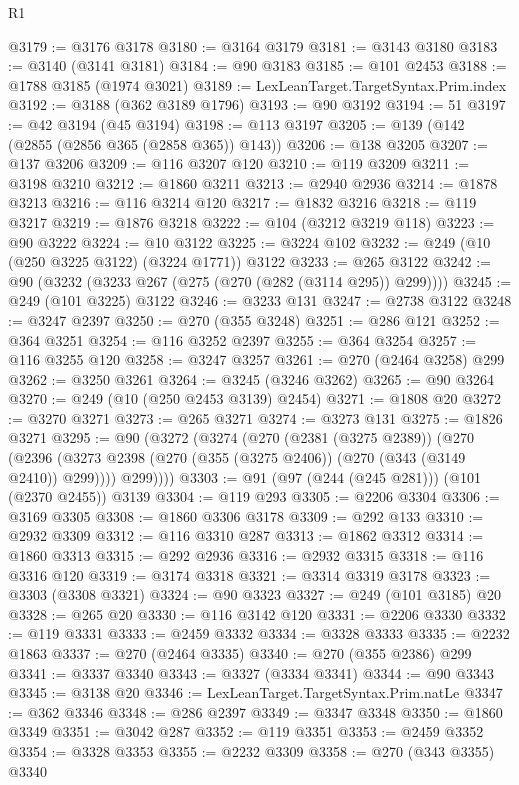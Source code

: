 \begin{lexlean}{R1}
\begin{coremodule}
@3179 := @3176 @3178
@3180 := @3164 @3179
@3181 := @3143 @3180
@3183 := @3140 (@3141 @3181)
@3184 := @90 @3183
@3185 := @101 @2453
@3188 := @1788 @3185 (@1974 @3021)
@3189 := LexLeanTarget.TargetSyntax.Prim.index
@3192 := @3188 (@362 @3189 @1796)
@3193 := @90 @3192
@3194 := 51
@3197 := @42 @3194 (@45 @3194)
@3198 := @113 @3197
@3205 := @139 (@142 (@2855 (@2856 @365 (@2858 @365)) @143))
@3206 := @138 @3205
@3207 := @137 @3206
@3209 := @116 @3207 @120
@3210 := @119 @3209
@3211 := @3198 @3210
@3212 := @1860 @3211
@3213 := @2940 @2936
@3214 := @1878 @3213
@3216 := @116 @3214 @120
@3217 := @1832 @3216
@3218 := @119 @3217
@3219 := @1876 @3218
@3222 := @104 (@3212 @3219 @118)
@3223 := @90 @3222
@3224 := @10 @3122
@3225 := @3224 @102
@3232 := @249 (@10 (@250 @3225 @3122) (@3224 @1771)) @3122
@3233 := @265 @3122
@3242 := @90 (@3232 (@3233 @267 (@275 (@270 (@282 (@3114 @295)) @299))))
@3245 := @249 (@101 @3225) @3122
@3246 := @3233 @131
@3247 := @2738 @3122
@3248 := @3247 @2397
@3250 := @270 (@355 @3248)
@3251 := @286 @121
@3252 := @364 @3251
@3254 := @116 @3252 @2397
@3255 := @364 @3254
@3257 := @116 @3255 @120
@3258 := @3247 @3257
@3261 := @270 (@2464 @3258) @299
@3262 := @3250 @3261
@3264 := @3245 (@3246 @3262)
@3265 := @90 @3264
@3270 := @249 (@10 (@250 @2453 @3139) @2454)
@3271 := @1808 @20
@3272 := @3270 @3271
@3273 := @265 @3271
@3274 := @3273 @131
@3275 := @1826 @3271
@3295 := @90
    (@3272
      (@3274
        (@270
          (@2381 (@3275 @2389))
          (@270
            (@2396 (@3273 @2398 (@270 (@355 (@3275 @2406)) (@270 (@343 (@3149 @2410)) @299))))
            @299))))
@3303 := @91 (@97 (@244 (@245 @281))) (@101 (@2370 @2455)) @3139
@3304 := @119 @293
@3305 := @2206 @3304
@3306 := @3169 @3305
@3308 := @1860 @3306 @3178
@3309 := @292 @133
@3310 := @2932 @3309
@3312 := @116 @3310 @287
@3313 := @1862 @3312
@3314 := @1860 @3313
@3315 := @292 @2936
@3316 := @2932 @3315
@3318 := @116 @3316 @120
@3319 := @3174 @3318
@3321 := @3314 @3319 @3178
@3323 := @3303 (@3308 @3321)
@3324 := @90 @3323
@3327 := @249 (@101 @3185) @20
@3328 := @265 @20
@3330 := @116 @3142 @120
@3331 := @2206 @3330
@3332 := @119 @3331
@3333 := @2459 @3332
@3334 := @3328 @3333
@3335 := @2232 @1863
@3337 := @270 (@2464 @3335)
@3340 := @270 (@355 @2386) @299
@3341 := @3337 @3340
@3343 := @3327 (@3334 @3341)
@3344 := @90 @3343
@3345 := @3138 @20
@3346 := LexLeanTarget.TargetSyntax.Prim.natLe
@3347 := @362 @3346
@3348 := @286 @2397
@3349 := @3347 @3348
@3350 := @1860 @3349
@3351 := @3042 @287
@3352 := @119 @3351
@3353 := @2459 @3352
@3354 := @3328 @3353
@3355 := @2232 @3309
@3358 := @270 (@343 @3355) @3340

\end{coremodule}
\end{lexlean}
